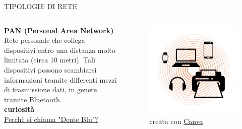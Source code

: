 \documentclass[aspectratio=1610]{beamer}
\begin{document}
\begin{frame}{TIPOLOGIE DI RETE}
    \begin{columns}
            \justifying
            \textbf{PAN (Personal Area Network)} \\
            Rete personale che collega dispositivi entro una distanza molto limitata (circa 10 metri). Tali 
            dispositivi possono scambiarsi informazioni tramite differenti mezzi di trasmissione dati, in genere 
            tramite Bluetooth.\\
            \bigskip
            \tiny{\textbf{curiosità}}\\
            \tiny{\href{https://www.ilpost.it/2014/12/31/bluetooth/}{Perchè si chiama "Dente Blu"?}}
            \begin{figure}
                \includegraphics[width=\linewidth]{img/pan.png}
                \caption{{creata con \href{https://www.canva.com/}{Canva}}}
            \end{figure}
    \end{columns}
\end{frame}
\end{document}
